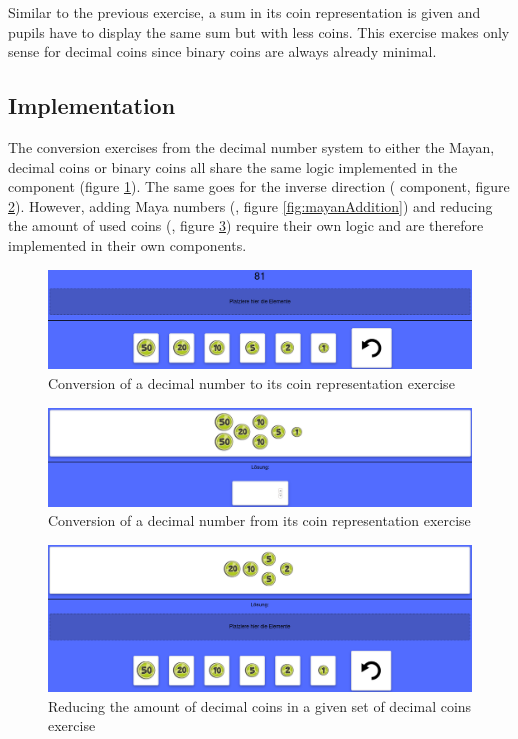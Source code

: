 Similar to the previous exercise, a sum in its coin representation is given and pupils have to display the same sum but with less coins. This exercise makes only sense for decimal coins since binary coins are always already minimal.

\subsection{Implementation}

The conversion exercises from the decimal number system to either the Mayan, decimal coins or binary coins all share the same logic implemented in the  component (figure \ref{fig:coinsTo}).
The same goes for the inverse direction ( component, figure \ref{fig:coinsFrom}).
However, adding Maya numbers (, figure \ref{fig:mayanAddition}) and reducing the amount of used coins (, figure \ref{fig:coinsSwap}) require their own logic and are therefore implemented in their own components.

\begin{figure} 
  \centering
  \includegraphics[width=1.0 \columnwidth]{figures/coins_to.png}
  \caption{Conversion of a decimal number to its coin representation exercise} 
  \label{fig:coinsTo} 
\end{figure}

\begin{figure} 
  \centering
  \includegraphics[width=1.0 \columnwidth]{figures/coins_from.png}
  \caption{Conversion of a decimal number from its coin representation exercise} 
  \label{fig:coinsFrom} 
\end{figure}

\begin{figure} 
  \centering
  \includegraphics[width=1.0 \columnwidth]{figures/coins_swap.png}
  \caption{Reducing the amount of decimal coins in a given set of decimal coins exercise} 
  \label{fig:coinsSwap} 
\end{figure}

